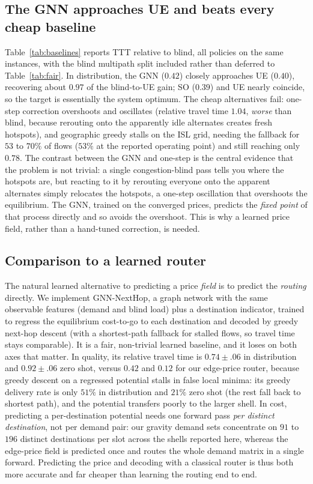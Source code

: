 \documentclass[journal]{IEEEtran}
\begin{document}
\subsection{The GNN approaches UE and beats every cheap baseline}
Table~\ref{tab:baselines} reports TTT relative to blind, all policies on the same instances, with the blind multipath split included rather than deferred to Table~\ref{tab:fair}. In distribution, the GNN ($0.42$) closely approaches UE
($0.40$), recovering about $0.97$ of the blind-to-UE gain; SO ($0.39$) and UE nearly
coincide, so the target is essentially the system optimum. The cheap alternatives fail:
one-step correction overshoots and oscillates (relative travel time $1.04$, \emph{worse}
than blind, because rerouting onto the apparently idle alternates creates fresh hotspots),
and geographic greedy stalls on the ISL grid, needing the fallback for $53$ to $70\%$ of
flows ($53\%$ at the reported operating point) and still reaching only $0.78$. The contrast
between the GNN and one-step is the central evidence that the problem is not trivial: a
single congestion-blind pass tells you where the hotspots are, but reacting to it by
rerouting everyone onto the apparent alternates simply relocates the hotspots, a
one-step oscillation that overshoots the equilibrium. The GNN, trained on the converged
prices, predicts the \emph{fixed point} of that process directly and so avoids the
overshoot. This is why a learned price field, rather than a hand-tuned correction, is
needed.

\subsection{Comparison to a learned router}
The natural learned alternative to predicting a price \emph{field} is to predict the
\emph{routing} directly. We implement GNN-NextHop, a graph network with the same observable
features (demand and blind load) plus a destination indicator, trained to regress the
equilibrium cost-to-go to each destination and decoded by greedy next-hop descent (with a
shortest-path fallback for stalled flows, so travel time stays comparable). It is a fair,
non-trivial learned baseline, and it loses on both axes that matter. In quality, its
relative travel time is $0.74\pm.06$ in distribution and $0.92\pm.06$ zero shot, versus
$0.42$ and $0.12$ for our edge-price router, because greedy descent on a regressed potential
stalls in false local minima: its greedy delivery rate is only $51\%$ in distribution and
$21\%$ zero shot (the rest fall back to shortest path), and the potential transfers poorly
to the larger shell. In cost, predicting a per-destination potential needs one forward pass
\emph{per distinct destination}, not per demand pair: our gravity demand sets concentrate on $91$ to $196$ distinct destinations per slot across the shells reported here, whereas the
edge-price field is predicted once and routes the whole demand matrix in a single forward.
Predicting the price and decoding with a classical router is thus both more accurate and far
cheaper than learning the routing end to end.
\end{document}

